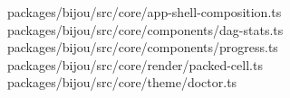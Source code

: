 \begin{itemize}
\allowbreak{}p\allowbreak{}a\allowbreak{}c\allowbreak{}k\allowbreak{}a\allowbreak{}g\allowbreak{}e\allowbreak{}s\allowbreak{}/\allowbreak{}b\allowbreak{}i\allowbreak{}j\allowbreak{}o\allowbreak{}u\allowbreak{}/\allowbreak{}s\allowbreak{}r\allowbreak{}c\allowbreak{}/\allowbreak{}c\allowbreak{}o\allowbreak{}r\allowbreak{}e\allowbreak{}/\allowbreak{}a\allowbreak{}p\allowbreak{}p\allowbreak{}-\allowbreak{}s\allowbreak{}h\allowbreak{}e\allowbreak{}l\allowbreak{}l\allowbreak{}-\allowbreak{}c\allowbreak{}o\allowbreak{}m\allowbreak{}p\allowbreak{}o\allowbreak{}s\allowbreak{}i\allowbreak{}t\allowbreak{}i\allowbreak{}o\allowbreak{}n\allowbreak{}.\allowbreak{}t\allowbreak{}s\allowbreak{} \allowbreak{}p\allowbreak{}a\allowbreak{}c\allowbreak{}k\allowbreak{}a\allowbreak{}g\allowbreak{}e\allowbreak{}s\allowbreak{}/\allowbreak{}b\allowbreak{}i\allowbreak{}j\allowbreak{}o\allowbreak{}u\allowbreak{}/\allowbreak{}s\allowbreak{}r\allowbreak{}c\allowbreak{}/\allowbreak{}c\allowbreak{}o\allowbreak{}r\allowbreak{}e\allowbreak{}/\allowbreak{}c\allowbreak{}o\allowbreak{}m\allowbreak{}p\allowbreak{}o\allowbreak{}n\allowbreak{}e\allowbreak{}n\allowbreak{}t\allowbreak{}s\allowbreak{}/\allowbreak{}d\allowbreak{}a\allowbreak{}g\allowbreak{}-\allowbreak{}s\allowbreak{}t\allowbreak{}a\allowbreak{}t\allowbreak{}s\allowbreak{}.\allowbreak{}t\allowbreak{}s\allowbreak{} \allowbreak{}p\allowbreak{}a\allowbreak{}c\allowbreak{}k\allowbreak{}a\allowbreak{}g\allowbreak{}e\allowbreak{}s\allowbreak{}/\allowbreak{}b\allowbreak{}i\allowbreak{}j\allowbreak{}o\allowbreak{}u\allowbreak{}/\allowbreak{}s\allowbreak{}r\allowbreak{}c\allowbreak{}/\allowbreak{}c\allowbreak{}o\allowbreak{}r\allowbreak{}e\allowbreak{}/\allowbreak{}c\allowbreak{}o\allowbreak{}m\allowbreak{}p\allowbreak{}o\allowbreak{}n\allowbreak{}e\allowbreak{}n\allowbreak{}t\allowbreak{}s\allowbreak{}/\allowbreak{}p\allowbreak{}r\allowbreak{}o\allowbreak{}g\allowbreak{}r\allowbreak{}e\allowbreak{}s\allowbreak{}s\allowbreak{}.\allowbreak{}t\allowbreak{}s\allowbreak{} \allowbreak{}p\allowbreak{}a\allowbreak{}c\allowbreak{}k\allowbreak{}a\allowbreak{}g\allowbreak{}e\allowbreak{}s\allowbreak{}/\allowbreak{}b\allowbreak{}i\allowbreak{}j\allowbreak{}o\allowbreak{}u\allowbreak{}/\allowbreak{}s\allowbreak{}r\allowbreak{}c\allowbreak{}/\allowbreak{}c\allowbreak{}o\allowbreak{}r\allowbreak{}e\allowbreak{}/\allowbreak{}r\allowbreak{}e\allowbreak{}n\allowbreak{}d\allowbreak{}e\allowbreak{}r\allowbreak{}/\allowbreak{}p\allowbreak{}a\allowbreak{}c\allowbreak{}k\allowbreak{}e\allowbreak{}d\allowbreak{}-\allowbreak{}c\allowbreak{}e\allowbreak{}l\allowbreak{}l\allowbreak{}.\allowbreak{}t\allowbreak{}s\allowbreak{} \allowbreak{}p\allowbreak{}a\allowbreak{}c\allowbreak{}k\allowbreak{}a\allowbreak{}g\allowbreak{}e\allowbreak{}s\allowbreak{}/\allowbreak{}b\allowbreak{}i\allowbreak{}j\allowbreak{}o\allowbreak{}u\allowbreak{}/\allowbreak{}s\allowbreak{}r\allowbreak{}c\allowbreak{}/\allowbreak{}c\allowbreak{}o\allowbreak{}r\allowbreak{}e\allowbreak{}/\allowbreak{}t\allowbreak{}h\allowbreak{}e\allowbreak{}m\allowbreak{}e\allowbreak{}/\allowbreak{}d\allowbreak{}o\allowbreak{}c\allowbreak{}t\allowbreak{}o\allowbreak{}r\allowbreak{}.\allowbreak{}t\allowbreak{}s\allowbreak{} 
\end{itemize}
